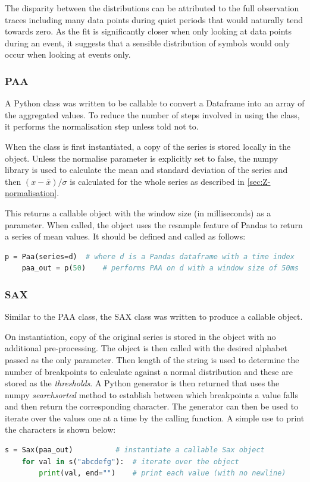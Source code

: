 \documentclass[../report.tex]{subfiles}
\begin{document}
	The disparity between the distributions can be attributed to the full observation traces including many data points during quiet periods that would naturally tend towards zero.  As the fit is significantly closer when only looking at data points during an event, it suggests that a sensible distribution of symbols would only occur when looking at events only.

\subsubsection{PAA}
	A Python class was written to be callable to convert a Dataframe into an array of the aggregated values.  To reduce the number of steps involved in using the class, it performs the normalisation step unless told not to.
	
	
	
	When the class is first instantiated, a copy of the series is stored locally in the object.  Unless the normalise parameter is explicitly set to false, the numpy library is used to calculate the mean and standard deviation of the series and then $(x - \bar{x}) / \sigma$ is calculated for the whole series as described in \cref{sec:Z-normalisation}.
	
	This returns a callable object with the window size (in milliseconds) as a parameter.  When called, the object uses the resample feature of Pandas to return a series of mean values.	It should be defined and called as follows:
	
\begin{lstlisting}[language=Python]
	p = Paa(series=d)  # where d is a Pandas dataframe with a time index
	paa_out = p(50)    # performs PAA on d with a window size of 50ms
\end{lstlisting}

\subsubsection{SAX}
	Similar to the PAA class, the SAX class was written to produce a callable object.

	
	
	On instantiation, copy of the original series is stored in the object with no additional pre-processing.  The object is then called with the desired alphabet passed as the only parameter.  Then length of the string is used to determine the number of breakpoints to calculate against a normal distribution and these are stored as the \textit{thresholds}.  A Python generator is then returned that uses the numpy \textit{searchsorted} method to establish between which breakpoints a value falls and then return the corresponding character.  The generator can then be used to iterate over the values one at a time by the calling function.  A simple use to print the characters is shown below:
	
\begin{lstlisting}[language=Python]
	s = Sax(paa_out)          # instantiate a callable Sax object
	for val in s("abcdefg"):  # iterate over the object
	    print(val, end="")    # print each value (with no newline)
\end{lstlisting}
	
\end{document}

